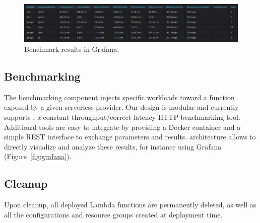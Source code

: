 

\begin{figure}[!t]
\begin{center}
\includegraphics[width=1\textwidth]{bilder/benchmark_table.png}
\caption[Benchmark results in Grafana]{Benchmark results in Grafana.}
\label{fig:benchmark_table}
\end{center}
\end{figure}


\subsection{Benchmarking}
The benchmarking component injects specific workloads toward a function exposed by a given serverless provider.
Our design is modular and currently supports , a constant throughput/correct latency HTTP benchmarking tool. 
Additional tools are easy to integrate by providing a Docker container and a simple REST interface to exchange parameters and results. 
\sys architecture allows to directly visualize and analyze these results, for instance using Grafana (Figure~\ref{fig:grafana}).

\subsection{Cleanup}
Upon cleanup, all deployed Lambda  functions are permanently deleted, as well as all the configurations and resource groups created at deployment time. %



